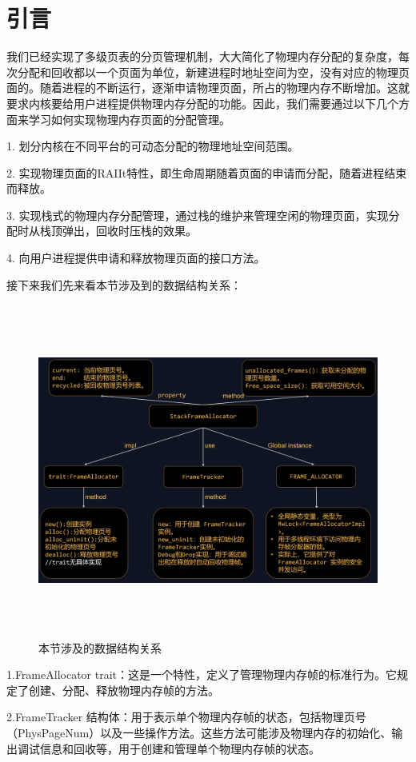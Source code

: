 	\section{引言}
	我们已经实现了多级页表的分页管理机制，大大简化了物理内存分配的复杂度，每次分配和回收都以一个页面为单位，新建进程时地址空间为空，没有对应的物理页面的。随着进程的不断运行，逐渐申请物理页面，所占的物理内存不断增加。这就要求内核要给用户进程提供物理内存分配的功能。因此，我们需要通过以下几个方面来学习如何实现物理内存页面的分配管理。
	
	1. 划分内核在不同平台的可动态分配的物理地址空间范围。
	
	2. 实现物理页面的RAIIt特性，即生命周期随着页面的申请而分配，随着进程结束而释放。
	
	3. 实现栈式的物理内存分配管理，通过栈的维护来管理空闲的物理页面，实现分配时从栈顶弹出，回收时压栈的效果。
	
	4. 向用户进程提供申请和释放物理页面的接口方法。
	
	接下来我们先来看本节涉及到的数据结构关系：
 \begin{figure}[h]
		\centering
		\includegraphics[width=14cm,height=11cm]{figures/04-03-本节涉及的数据库关系.png}
		\caption{本节涉及的数据结构关系}
 \end{figure}    
 \justifying  
 
 1.FrameAllocator trait：这是一个特性，定义了管理物理内存帧的标准行为。它规定了创建、分配、释放物理内存帧的方法。

 2.FrameTracker 结构体：用于表示单个物理内存帧的状态，包括物理页号（PhysPageNum）以及一些操作方法。这些方法可能涉及物理内存的初始化、输出调试信息和回收等，用于创建和管理单个物理内存帧的状态。

